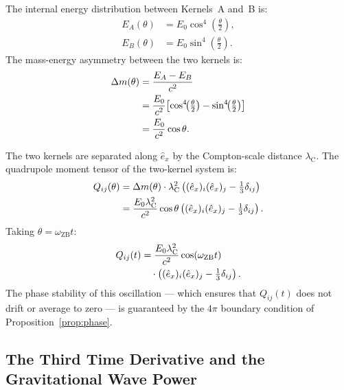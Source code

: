 \documentclass[%
 reprint, amsmath,amssymb, aps, prb, ]{revtex4-2}
\numberwithin{equation}{section}
\newcommand{\iphase}{\theta}
\newcommand{\omZB}{\omega_{\text{ZB}}}
\newcommand{\lambdaC}{\lambda_{\mathrm{C}}}
\newcommand{\ehat}[1]{\hat{e}_{#1}}
\begin{document}
The internal energy distribution between Kernels~A and~B is:
\begin{align}
E_A(\iphase) &= E_0\cos^4\!\!\left(\frac{\iphase}{2}\right), \label{eq:EA}\\
E_B(\iphase) &= E_0\sin^4\!\!\left(\frac{\iphase}{2}\right). \label{eq:EB}
\end{align}
The mass-energy asymmetry between the two kernels is:
\begin{align}
\Delta m(\iphase)
&= \frac{E_A - E_B}{c^2}
\notag\\
&= \frac{E_0}{c^2}\!\left[
\cos^4\!\!\left(\tfrac{\iphase}{2}\right)
- \sin^4\!\!\left(\tfrac{\iphase}{2}\right)
\right]
\notag\\
&= \frac{E_0}{c^2}\cos\iphase.
\label{eq:mass_asymmetry}
\end{align}

The two kernels are separated along $\ehat{x}$ by the Compton-scale distance $\lambdaC$.
The quadrupole moment tensor of the two-kernel system is:
\begin{align}
Q_{ij}(\iphase)
&= \Delta m(\iphase)\cdot\lambdaC^2
\left((\ehat{x})_i(\ehat{x})_j - \tfrac{1}{3}\delta_{ij}\right)
\notag\\
&= \frac{E_0\lambdaC^2}{c^2}\cos\iphase
\left((\ehat{x})_i(\ehat{x})_j - \tfrac{1}{3}\delta_{ij}\right).
\label{eq:Qij}
\end{align}
Taking $\iphase = \omZB t$:
\begin{align}
Q_{ij}(t)
&= \frac{E_0\lambdaC^2}{c^2}\cos(\omZB t)
\notag\\
&\quad\cdot\left((\ehat{x})_i(\ehat{x})_j - \tfrac{1}{3}\delta_{ij}\right).
\label{eq:Qij_t}
\end{align}
The phase stability of this oscillation --- which ensures that $Q_{ij}(t)$ does not drift or average to zero --- is guaranteed by the $4\pi$ boundary condition of Proposition~\ref{prop:phase}.

\subsection{The Third Time Derivative and the Gravitational Wave Power}
\end{document}

